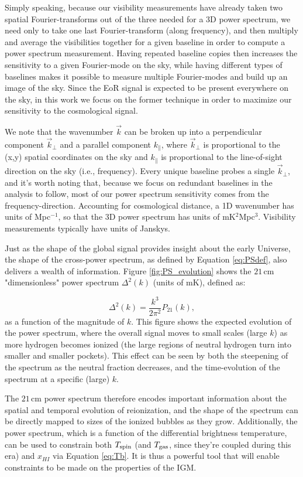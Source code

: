 Simply speaking, because our visibility measurements have already taken two spatial Fourier-transforms out of the three needed for a 3D power spectrum, we need only to take one last Fourier-transform (along frequency), and then multiply and average the visibilities together for a given baseline in order to compute a power spectrum measurement. Having repeated baseline copies then increases the sensitivity to a given Fourier-mode on the sky, while having different types of baselines makes it possible to measure multiple Fourier-modes and build up an image of the sky. Since the EoR signal is expected to be present everywhere on the sky, in this work we focus on the former technique in order to maximize our sensitivity to the cosmological signal.

We note that the wavenumber $\vec{k}$ can be broken up into a perpendicular component $\vec{k}_{\perp}$ and a parallel component $k_{\parallel}$, where $\vec{k}_{\perp}$ is proportional to the (x,y) spatial coordinates on the sky and $k_{\parallel}$ is proportional to the line-of-sight direction on the sky (i.e., frequency). Every unique baseline probes a single $\vec{k}_{\perp}$, and it's worth noting that, because we focus on redundant baselines in the analysis to follow, most of our power spectrum sensitivity comes from the frequency-direction. Accounting for cosmological distance, a 1D wavenumber has units of Mpc$^{-1}$, so that the 3D power spectrum has units of mK$^{2}$Mpc$^{3}$. Visibility measurements typically have units of Janskys.

Just as the shape of the global signal provides insight about the early Universe, the shape of the cross-power spectrum, as defined by Equation \eqref{eq:PSdef}, also delivers a wealth of information. Figure \ref{fig:PS_evolution} shows the $21$\,cm "dimensionless" power spectrum $\Delta^{2}(k)$ (units of mK), defined as:

\begin{equation}
\Delta^{2}(k) = \frac{k^{3}}{2\pi^{2}}P_{21}(k),
\end{equation}
as a function of the magnitude of $k$. This figure shows the expected evolution of the power spectrum, where the overall signal moves to small scales (large $k$) as more hydrogen becomes ionized (the large regions of neutral hydrogen turn into smaller and smaller pockets). This effect can be seen by both the steepening of the spectrum as the neutral fraction decreases, and the time-evolution of the spectrum at a specific (large) $k$.

The $21$\,cm power spectrum therefore encodes important information about the spatial and temporal evolution of reionization, and the shape of the spectrum can be directly mapped to sizes of the ionized bubbles as they grow. Additionally, the power spectrum, which is a function of the differential brightness temperature, can be used to constrain both $T_{\rm spin}$ (and $T_{\rm gas}$, since they're coupled during this era) and $x_{HI}$ via Equation \eqref{eq:Tb}. It is thus a powerful tool that will enable constraints to be made on the properties of the IGM.

